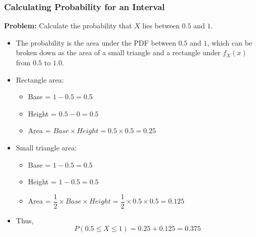\documentclass[handout]{beamer} %
\begin{document}
\begin{frame}
\frametitle{Calculating Probability for an Interval}
\textbf{Problem:} Calculate the probability that $X$ lies between $0.5$ and $1$.  \pause
    \begin{itemize}
        \item The probability is the area under the PDF between $0.5$ and $1$, which can be broken down as the area of a small triangle and a rectangle under $f_X(x)$ from $0.5$ to $1.0$. \pause
        \item Rectangle area:
        \begin{itemize}
            \item Base = $1 - 0.5 = 0.5$ \pause
            \item Height = $0.5 - 0 = 0.5$ \pause
            \item Area = $Base \times Height  = 0.5\times 0.5 = 0.25$
        \end{itemize}
        \item Small triangle area: 
        \begin{itemize}
            \item Base = $1 - 0.5 = 0.5$ \pause
            \item Height = $1 - 0.5 = 0.5$ \pause
            \item Area = $\dfrac{1}{2}\times Base \times Height  = \dfrac{1}{2}\times 0.5 \times 0.5= 0.125$
        \end{itemize}
        
        \item Thus,
        \[
        P(0.5 \leq X \leq 1) = 0.25 + 0.125 = 0.375
        \]
    \end{itemize}
\end{frame}
\end{document}
